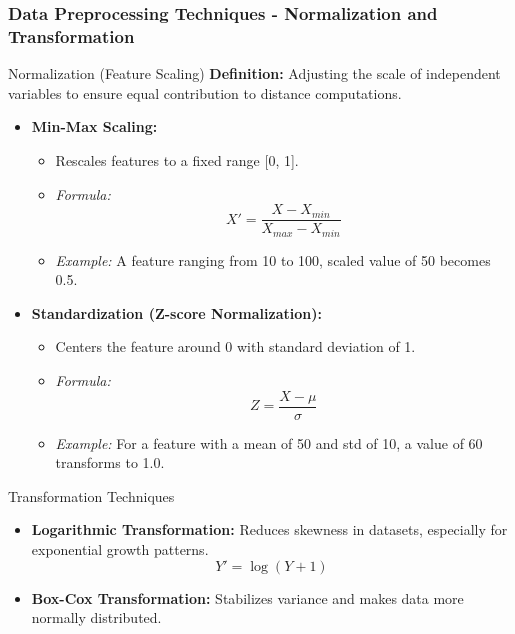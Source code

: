 \documentclass[aspectratio=169]{beamer}
\begin{document}
\begin{frame}[fragile]
    \frametitle{Data Preprocessing Techniques - Normalization and Transformation}
    \begin{block}{Normalization (Feature Scaling)}
        \textbf{Definition:} Adjusting the scale of independent variables to ensure equal contribution to distance computations.
        
        \begin{itemize}
            \item \textbf{Min-Max Scaling:}
                \begin{itemize}
                    \item Rescales features to a fixed range [0, 1].
                    \item \textit{Formula:}
                    \begin{equation}
                    X' = \frac{X - X_{min}}{X_{max} - X_{min}}
                    \end{equation}
                    \item \textit{Example:} A feature ranging from 10 to 100, scaled value of 50 becomes 0.5.
                \end{itemize}

            \item \textbf{Standardization (Z-score Normalization):}
                \begin{itemize}
                    \item Centers the feature around 0 with standard deviation of 1.
                    \item \textit{Formula:}
                    \begin{equation}
                    Z = \frac{X - \mu}{\sigma}
                    \end{equation}
                    \item \textit{Example:} For a feature with a mean of 50 and std of 10, a value of 60 transforms to 1.0.
                \end{itemize}
        \end{itemize}
    \end{block}

    \begin{block}{Transformation Techniques}
        \begin{itemize}
            \item \textbf{Logarithmic Transformation:} Reduces skewness in datasets, especially for exponential growth patterns.
                \begin{equation}
                Y' = \log(Y + 1)
                \end{equation}
            \item \textbf{Box-Cox Transformation:} Stabilizes variance and makes data more normally distributed.
        \end{itemize}
    \end{block}
    
\end{frame}
\end{document}
